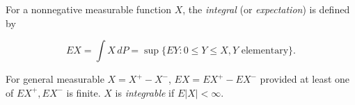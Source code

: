 For a nonnegative measurable function $X$, the \textit{integral} (or \textit{expectation}) is defined by

$$EX = \int X \, dP = \sup \{ EY : 0 \leq Y \leq X, Y \text{ elementary} \}.$$

For general measurable $X = X^+ - X^-$, $EX = EX^+ - EX^-$ provided at least one of $EX^+, EX^-$ is finite. $X$ is \textit{integrable} if $E|X| < \infty$.
